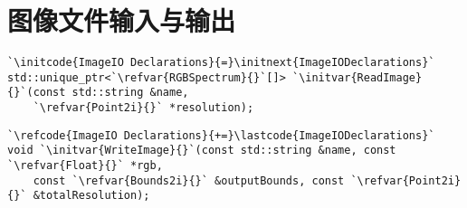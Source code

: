 \section{图像文件输入与输出}\label{sec:图像文件输入与输出}
\begin{lstlisting}
`\initcode{ImageIO Declarations}{=}\initnext{ImageIODeclarations}`
std::unique_ptr<`\refvar{RGBSpectrum}{}`[]> `\initvar{ReadImage}{}`(const std::string &name,
    `\refvar{Point2i}{}` *resolution);
\end{lstlisting}
\begin{lstlisting}
`\refcode{ImageIO Declarations}{+=}\lastcode{ImageIODeclarations}`
void `\initvar{WriteImage}{}`(const std::string &name, const `\refvar{Float}{}` *rgb,
    const `\refvar{Bounds2i}{}` &outputBounds, const `\refvar{Point2i}{}` &totalResolution);
\end{lstlisting}